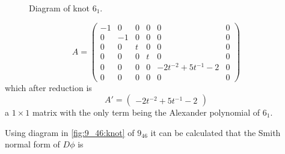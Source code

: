 \begin{example}
\begin{figure}[h]
\begin{tikzpicture}[bgnd/.style={circle, fill=white, draw=white}]
  \end{tikzpicture}
  \caption{\label{fig:6_1:knot}Diagram of knot $6_1$.}
\end{figure}
$$A=\begin{pmatrix}
  -1 & 0 & 0 & 0 & 0 & 0 \\ 
  0 & -1 & 0 & 0 & 0 & 0 \\ 
  0 & 0 & t & 0 & 0 & 0 \\ 
  0 & 0 & 0 & t & 0 & 0 \\ 
  0 & 0 & 0 & 0 & -2t^{-2}+5t^{-1}-2 & 0 \\ 
  0 & 0 & 0 & 0 & 0 & 0 
\end{pmatrix}$$
which after reduction is
$$A'=
\begin{pmatrix}
  -2t^{-2}+5t^{-1}-2
\end{pmatrix}
$$
a $1\times 1$ matrix with the only term being the Alexander polynomial of $6_1$.

Using diagram in \cref{fig:9_46:knot} of $9_{46}$ it can be calculated that the Smith normal form of $D\phi$ is
\begin{figure}[h]\centering
\end{figure}
\end{example}
